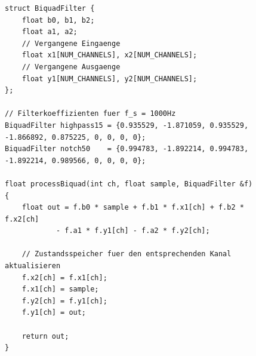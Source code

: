         \begin{figure}
            \begin{lstlisting}[style=myArduino, caption={Implementierung der Biquad Filter auf dem Teensy~4.1}, label={code:filter}]
struct BiquadFilter {
    float b0, b1, b2;
    float a1, a2;
    // Vergangene Eingaenge
    float x1[NUM_CHANNELS], x2[NUM_CHANNELS];
    // Vergangene Ausgaenge
    float y1[NUM_CHANNELS], y2[NUM_CHANNELS];
};

// Filterkoeffizienten fuer f_s = 1000Hz
BiquadFilter highpass15 = {0.935529, -1.871059, 0.935529, -1.866892, 0.875225, 0, 0, 0, 0};
BiquadFilter notch50    = {0.994783, -1.892214, 0.994783, -1.892214, 0.989566, 0, 0, 0, 0};

float processBiquad(int ch, float sample, BiquadFilter &f) {
    float out = f.b0 * sample + f.b1 * f.x1[ch] + f.b2 * f.x2[ch] 
            - f.a1 * f.y1[ch] - f.a2 * f.y2[ch];
    
    // Zustandsspeicher fuer den entsprechenden Kanal aktualisieren
    f.x2[ch] = f.x1[ch];
    f.x1[ch] = sample;
    f.y2[ch] = f.y1[ch];
    f.y1[ch] = out;
    
    return out;
}
            \end{lstlisting}
        \end{figure}